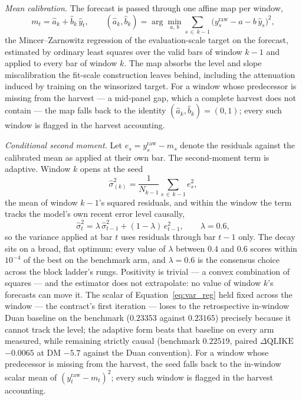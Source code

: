 \emph{Mean calibration.} The forecast is passed through one affine map per
window,
\begin{equation}
    m_t = \hat{a}_k + \hat{b}_k\, \hat{y}_t,
    \qquad
    (\hat{a}_k, \hat{b}_k)
    = \arg\min_{a,\, b} \sum_{s \,\in\, k-1}
      \bigl(y^{\mathrm{raw}}_s - a - b\,\hat{y}_s\bigr)^2,
    \label{eq:mean_calib}
\end{equation}
the Mincer--Zarnowitz regression of the evaluation-scale target on the
forecast, estimated by ordinary least squares over the valid bars of
window $k-1$ and applied to every bar of window $k$. The map absorbs the
level and slope miscalibration the fit-scale construction leaves behind,
including the attenuation induced by training on the winsorized target.
For a window whose predecessor is missing from the harvest --- a
mid-panel gap, which a complete harvest does not contain --- the map
falls back to the identity $(\hat{a}_k, \hat{b}_k) = (0, 1)$; every such
window is flagged in the harvest accounting.

\emph{Conditional second moment.} Let
$e_s = y^{\mathrm{raw}}_s - m_s$ denote the residuals against the
calibrated mean as applied at their own bar. The second-moment term is
adaptive. Window $k$ opens at the seed
\begin{equation}
    \hat{\sigma}^2_{(k)}
    = \frac{1}{N_{k-1}} \sum_{s \,\in\, k-1} e_s^2,
    \label{eq:var_reg}
\end{equation}
the mean of window $k-1$'s squared residuals, and within the window the
term tracks the model's own recent error level causally,
\begin{equation}
    \hat{\sigma}^2_t
    = \lambda\, \hat{\sigma}^2_{t-1} + (1 - \lambda)\, e_{t-1}^2,
    \qquad \lambda = 0.6,
    \label{eq:var_ewma}
\end{equation}
so the variance applied at bar $t$ uses residuals through bar $t-1$
only. The decay sits on a broad, flat optimum: every value of $\lambda$
between $0.4$ and $0.6$ scores within $10^{-4}$ of the best on the
benchmark arm, and $\lambda = 0.6$ is the consensus choice across the
block ladder's rungs. Positivity is trivial --- a convex combination of
squares --- and the estimator does not extrapolate: no value of window
$k$'s forecasts can move it. The scalar of
Equation~\eqref{eq:var_reg} held fixed across the window --- the
contract's first iteration --- loses to the retrospective in-window Duan
baseline on the benchmark ($0.23353$ against $0.23165$) precisely
because it cannot track the level; the adaptive form beats that
baseline on every arm measured, while remaining strictly causal
(benchmark $0.22519$, paired $\Delta\mathrm{QLIKE}$ $-0.0065$ at DM
$-5.7$ against the Duan convention). For a window whose predecessor is
missing from the harvest, the seed falls back to the in-window scalar
mean of $(y^{\mathrm{raw}}_t - m_t)^2$; every such window is flagged in
the harvest accounting.

